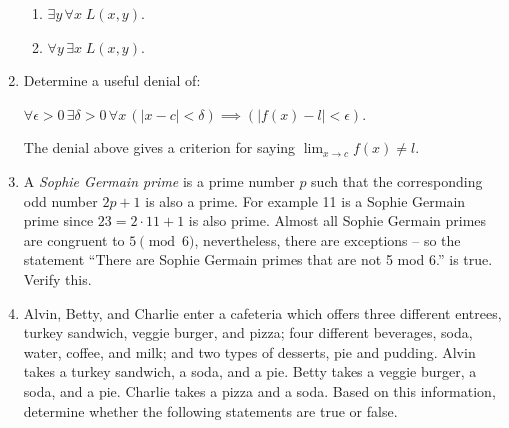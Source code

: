 \begin{enumerate}
{\begin{enumerate}
Here's a couple of bonus questions. Two of the statments above have different meanings if you just interchange the order that the quantifiers appear in. What do the following mean (in contrast to the ones above)?

\item $\exists y \, \forall x \; L(x, y)$.
\item $\forall y \, \exists x \; L(x,y)$.
\end{enumerate}

}

\item Determine a useful denial of: 

$\displaystyle \forall \epsilon>0 \, \exists 
\delta>0 \, \forall x \, (|x-c| < \delta) \implies (|f(x)-l| < \epsilon) $.

The denial above gives a criterion for saying $\lim_{x\rightarrow c}f(x) \neq l.$


\item A  \emph{Sophie Germain prime} is a prime number $p$
such that the corresponding odd number $2p+1$ is also a prime.  For example 11 is a 
Sophie Germain prime since $23 = 2\cdot 11 + 1$ is also prime.  Almost all Sophie Germain
primes are congruent to $5 \pmod{6}$, nevertheless, there are exceptions -- so the
statement ``There are Sophie Germain primes that are not 5 mod 6.'' is true.  Verify this.


\item  Alvin, Betty, and Charlie enter a cafeteria which offers three different
entrees, turkey sandwich, veggie burger, and pizza; four different
beverages, soda, water, coffee, and milk; and two types of desserts,
pie and pudding. Alvin takes a turkey sandwich, a soda, and a pie.
Betty takes a veggie burger, a soda, and a pie. Charlie takes a pizza
and a soda. Based on this information, determine whether the following
statements are true or false.


\end{enumerate}
